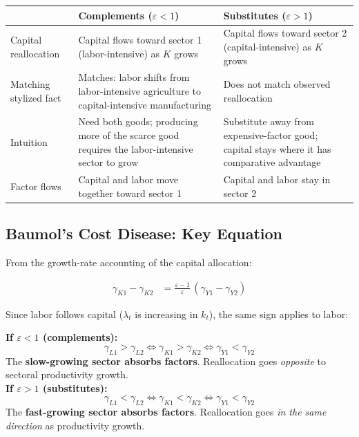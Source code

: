 \documentclass[a4paper,11pt]{article}
\begin{document}
\begin{center}
\begin{tabular}{p{3.5cm}p{5.5cm}p{5.5cm}}
\toprule
\textbf{} & \textbf{Complements ($\varepsilon < 1$)} & \textbf{Substitutes ($\varepsilon > 1$)} \\
\midrule
Capital reallocation & Capital flows toward sector 1 (labor-intensive) as $K$ grows & Capital flows toward sector 2 (capital-intensive) as $K$ grows \\
Matching stylized fact & Matches: labor shifts from labor-intensive agriculture to capital-intensive manufacturing & Does not match observed reallocation \\
Intuition & Need both goods; producing more of the scarce good requires the labor-intensive sector to grow & Substitute away from expensive-factor good; capital stays where it has comparative advantage \\
Factor flows & Capital and labor move together toward sector 1 & Capital and labor stay in sector 2 \\
\bottomrule
\end{tabular}
\end{center}

\subsection*{Baumol's Cost Disease: Key Equation}

From the growth-rate accounting of the capital allocation:

\begin{keyformulabox}[title={Baumol Reallocation Condition}]
\begin{align*}
\gamma_{K1} - \gamma_{K2} &= \frac{\varepsilon - 1}{\varepsilon}\, (\gamma_{Y1} - \gamma_{Y2})
\tag{Baumol}
\end{align*}
\end{keyformulabox}

Since labor follows capital ($\lambda_t$ is increasing in $k_t$), the same sign applies to labor:

\begin{resultbox}
\textbf{If $\varepsilon < 1$ (complements):}
\[
\gamma_{L1} > \gamma_{L2} \iff \gamma_{K1} > \gamma_{K2} \iff \gamma_{Y1} < \gamma_{Y2}
\]
The \textbf{slow-growing sector absorbs factors}. Reallocation goes \emph{opposite} to sectoral productivity growth.\\[0.4em]
\textbf{If $\varepsilon > 1$ (substitutes):}
\[
\gamma_{L1} < \gamma_{L2} \iff \gamma_{K1} < \gamma_{K2} \iff \gamma_{Y1} < \gamma_{Y2}
\]
The \textbf{fast-growing sector absorbs factors}. Reallocation goes \emph{in the same direction} as productivity growth.
\end{resultbox}
\end{document}
